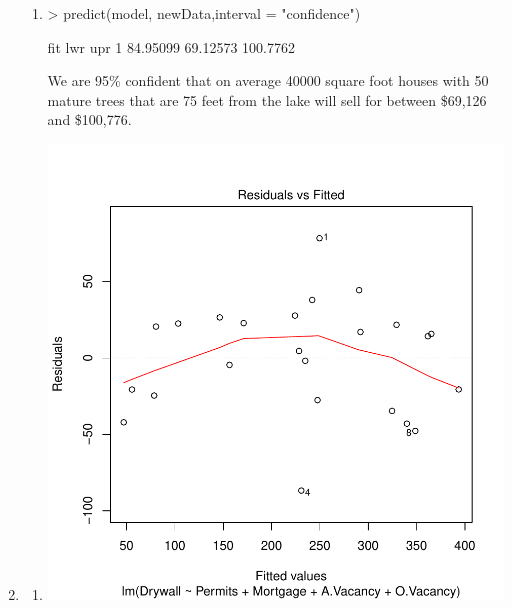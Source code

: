 \documentclass[]{article}
\begin{document}
\begin{enumerate}
\begin{enumerate}
\item

\begin{Schunk}
\begin{Sinput}
> predict(model, newData,interval = "confidence")
\end{Sinput}
\begin{Soutput}
       fit      lwr      upr
1 84.95099 69.12573 100.7762
\end{Soutput}
\end{Schunk}

We are 95\% confident that on average 40000 square foot houses with 50 mature trees that are 75 feet from the lake will sell for between \$69,126 and \$100,776.

\end{enumerate}

\item

\begin{enumerate}

\item

\begin{Schunk}
\end{Schunk}
\includegraphics{Homework4-006}


\end{enumerate}
\end{enumerate}
\end{document}
